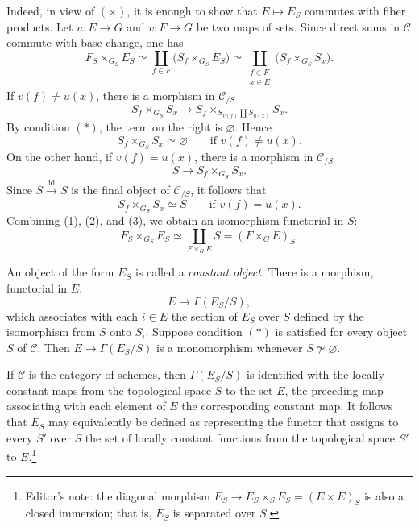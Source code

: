 Indeed, in view of \((\times)\), it is enough to show that
\(E\mapsto E_S\) commutes with fiber products. Let \(u:E\to G\) and
\(v:F\to G\) be two maps of sets. Since direct sums in \(\mathscr C\)
commute with base change, one has
\begin{equation}
  \tag{1}
  F_S\mathbin{\times_{G_S}}E_S
  \simeq
  \coprod_{f\in F}
    \bigl(S_f\mathbin{\times_{G_S}}E_S\bigr)
  \simeq
  \coprod_{\substack{f\in F\\x\in E}}
    \bigl(S_f\mathbin{\times_{G_S}}S_x\bigr).
\end{equation}
If \(v(f)\ne u(x)\), there is a morphism in \(\mathscr C_{/S}\)
\[
  S_f\mathbin{\times_{G_S}}S_x
  \longrightarrow
  S_f\mathbin{\times_{S_{v(f)}\coprod S_{u(x)}}}S_x.
\]
By condition \((*)\), the term on the right is \(\varnothing\). Hence
\begin{equation}
  \tag{2}
  S_f\mathbin{\times_{G_S}}S_x\simeq\varnothing
  \qquad\text{if }v(f)\ne u(x).
\end{equation}
On the other hand, if \(v(f)=u(x)\), there is a morphism in
\(\mathscr C_{/S}\)
\[
  S\longrightarrow S_f\mathbin{\times_{G_S}}S_x.
\]
Since \(S\xrightarrow{\operatorname{id}}S\) is the final object of
\(\mathscr C_{/S}\), it follows that
\begin{equation}
  \tag{3}
  S_f\mathbin{\times_{G_S}}S_x\simeq S
  \qquad\text{if }v(f)=u(x).
\end{equation}
Combining (1), (2), and (3), we obtain an isomorphism functorial in \(S\):
\[
  F_S\mathbin{\times_{G_S}}E_S
  \simeq \coprod_{F\times_G E}S
  =(F\mathbin{\times_G}E)_S.
\]

An object of the form \(E_S\) is called a \emph{constant object}. There is
a morphism, functorial in \(E\),
\[
  E\longrightarrow\Gamma(E_S/S),
\]
which associates with each \(i\in E\) the section of \(E_S\) over \(S\)
defined by the isomorphism from \(S\) onto \(S_i\). Suppose condition
\((*)\) is satisfied for every object \(S\) of \(\mathscr C\). Then
\(E\to\Gamma(E_S/S)\) is a monomorphism whenever
\(S\not\simeq\varnothing\).

If \(\mathscr C\) is the category of schemes, then
\(\Gamma(E_S/S)\) is identified with the locally constant maps from the
topological space \(S\) to the set \(E\), the preceding map associating with
each element of \(E\) the corresponding constant map. It follows that
\(E_S\) may equivalently be defined as representing the functor that assigns
to every \(S'\) over \(S\) the set of locally constant functions from the
topological space \(S'\) to \(E\).\footnote{Editor's note: the diagonal
morphism
\(E_S\to E_S\times_SE_S=(E\times E)_S\) is also a closed immersion; that
is, \(E_S\) is separated over \(S\).}

